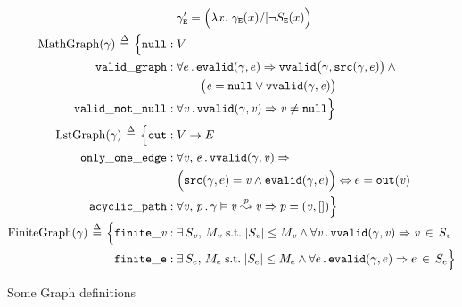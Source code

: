 \begin{figure}
\begin{gather*}
\begin{aligned}
       	 	&\gamma'_{\mathtt{E}} = \Big(\lambda x.~ \gamma_{\mathtt{E}}(x) /| \lnot S_{\mathtt{E}}(x)\Big)\\
        \mathrm{MathGraph}(\gamma)\,\defeq\,\Big\{
          \mathtt{null}:\; & V\\ 
          \mathtt{valid\_graph}:\;& \forall e\,.\,\mathtt{evalid}(\gamma, e) \Rightarrow
          \mathtt{vvalid}\big(\gamma, \mathtt{src}(\gamma, e)\big)\wedge \null \\
          & \qquad \big(\m{e} = \mathtt{null} \vee \mathtt{vvalid}(\gamma, \m{e})\big)\\
          \mathtt{valid\_not\_null}:\;& \forall \m{v}\,.\,\mathtt{vvalid}(\gamma, \m{v})
          \Rightarrow \m{v} \neq \mathtt{null} \Big\} \\
        \mathrm{LstGraph}(\gamma)\,\defeq\, \Big\{
          \mathtt{out}:\; & V \rightarrow E\\
          \mathtt{only\_one\_edge}:\; & \forall \m{v},\,e\,.\,
          \mathtt{vvalid}(\gamma, \m{v}) \Rightarrow \\
          & \Big(\mathtt{src}(\gamma, e) =\m{v} \wedge
          \mathtt{evalid}(\gamma, e)\Big) \Leftrightarrow
          e = \mathtt{out}(\m{v})\\
         \mathtt{acyclic\_path}:\; & \forall \m{v},\,p\,.\,
         \gamma \vDash \m{v} \overset{p}{\leadsto} \m{v} \Rightarrow p = (\m{v},[])\Big\} \\
       	\mathrm{FiniteGraph}(\gamma)\,\defeq\, \Big\{
          \mathtt{finite\_\m{v}}:\;&\exists\, S_\m{v},\, M_\m{v}\;\text{s.t.}\;\lvert S_\m{v}\rvert
          \leq M_\m{v} \wedge
          \forall \m{v}\,.\, \mathtt{vvalid}(\gamma,\m{v})\Rightarrow \m{v}\,\in\,S_\m{v}\\
          \mathtt{finite\_e}:\;&\exists\, S_e,\, M_e\;\text{s.t.}\;\lvert S_e\rvert
          \leq M_e \wedge
          \forall e\,.\, \mathtt{evalid}(\gamma,e)\Rightarrow e\,\in\,S_e \Big\}
    	\end{aligned}
    \end{gather*}
\caption{Some Graph definitions}
\label{fig:graphdefns}
\vspace{-1em}
\end{figure}